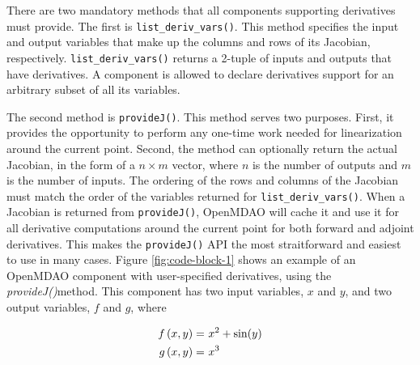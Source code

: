 \documentclass[]{aiaa-tc} %
\begin{document}
        There are two mandatory methods that all components supporting derivatives must provide.
        The first is \texttt{list\_deriv\_vars()}. This method specifies the
        input and output variables that make up the columns and rows of its Jacobian, respectively.
        \texttt{list\_deriv\_vars()} returns a 2-tuple of inputs and outputs that have derivatives.
        A component is allowed to declare derivatives support for an arbitrary subset of all its variables.

        The second method is \texttt{provideJ()}. This method serves two purposes. First, it provides the
        opportunity to perform any one-time work needed for linearization around the current point. Second,
        the method can optionally return the actual Jacobian, in the form of a $n \times m$ vector, where $n$ is the
        number of outputs and $m$ is the number of inputs. The ordering of the rows and columns of the Jacobian
        must match the order of the variables returned for \texttt{list\_deriv\_vars()}. When a Jacobian is
        returned from \texttt{provideJ()}, OpenMDAO will cache it and use it for all derivative computations
        around the current point for both forward and adjoint derivatives. This makes the \texttt{provideJ()}
        API the most straitforward and easiest to use in many cases. Figure \ref{fig:code-block-1} shows
        an example of an OpenMDAO component with user-specified derivatives, using the \textit{provideJ()}method.
        This component has two input variables, $x$ and $y$, and two output variables, $f$ and $g$, where

        \begin{align}
            f\left(x, y\right) =&\  x^2 + \sin(y) \\ \notag
            g\left(x, y\right) =&\  x^3
        \end{align}
\end{document}
